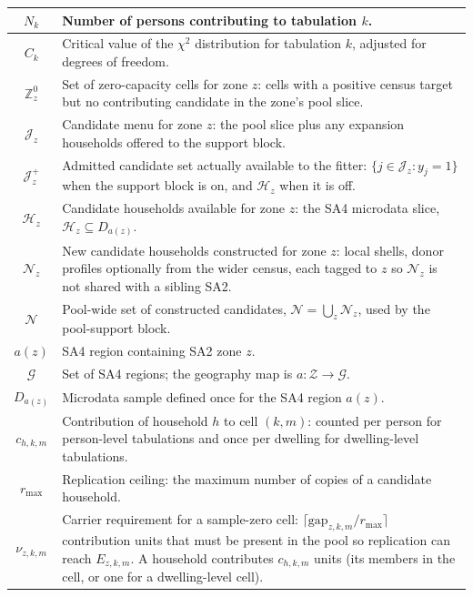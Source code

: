 \begin{longtable}{|c|p{10cm}|}
\( N_k \) & Number of persons contributing to tabulation \( k \). \\ \hline
\( C_k \) & Critical value of the \(\chi^2\) distribution for tabulation \( k \), adjusted for degrees of freedom. \\ \hline
\( \mathbb{Z}^0_z \) & Set of zero-capacity cells for zone \( z \): cells with a positive census target but no contributing candidate in the zone's pool slice. \\ \hline
\( \mathcal{J}_z \) & Candidate menu for zone \( z \): the pool slice plus any expansion households offered to the support block. \\ \hline
\( \mathcal{J}_z^{+} \) & Admitted candidate set actually available to the fitter: \( \{j\in\mathcal{J}_z:y_j=1\} \) when the support block is on, and \( \mathcal{H}_z \) when it is off. \\ \hline
\( \mathcal{H}_z \) & Candidate households available for zone \( z \): the SA4 microdata slice, \( \mathcal{H}_z \subseteq D_{a(z)} \). \\ \hline
\( \mathcal{N}_z \) & New candidate households constructed for zone \( z \): local shells, donor profiles optionally from the wider census, each tagged to \( z \) so \( \mathcal{N}_z \) is not shared with a sibling SA2. \\ \hline
\( \mathcal{N} \) & Pool-wide set of constructed candidates, \( \mathcal{N}=\bigcup_{z}\mathcal{N}_z \), used by the pool-support block. \\ \hline
\( a(z) \) & SA4 region containing SA2 zone \( z \). \\ \hline
\( \mathcal{G} \) & Set of SA4 regions; the geography map is \( a: \mathcal{Z} \to \mathcal{G} \). \\ \hline
\( D_{a(z)} \) & Microdata sample defined once for the SA4 region \( a(z) \). \\ \hline
\( c_{h,k,m} \) & Contribution of household \( h \) to cell \( (k,m) \): counted per person for person-level tabulations and once per dwelling for dwelling-level tabulations. \\ \hline
\( r_{\max} \) & Replication ceiling: the maximum number of copies of a candidate household. \\ \hline
\( \nu_{z,k,m} \) & Carrier requirement for a sample-zero cell: \( \lceil \mathrm{gap}_{z,k,m}/r_{\max}\rceil \) contribution units that must be present in the pool so replication can reach \( E_{z,k,m} \). A household contributes \( c_{h,k,m} \) units (its members in the cell, or one for a dwelling-level cell). \\ \hline

\end{longtable}
